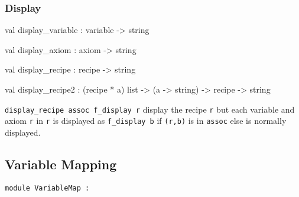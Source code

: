 \subsubsection{Display}




\label{val:Recipe.display-underscorevariable}\begin{ocamldoccode}
val display_variable : variable -> string
\end{ocamldoccode}




\label{val:Recipe.display-underscoreaxiom}\begin{ocamldoccode}
val display_axiom : axiom -> string
\end{ocamldoccode}




\label{val:Recipe.display-underscorerecipe}\begin{ocamldoccode}
val display_recipe : recipe -> string
\end{ocamldoccode}




\label{val:Recipe.display-underscorerecipe2}\begin{ocamldoccode}
val display_recipe2 :
  (recipe * {\textquotesingle}a) list -> ({\textquotesingle}a -> string) -> recipe -> string
\end{ocamldoccode}
\begin{ocamldocdescription}
{\tt{display\_recipe assoc f\_display r}} display the recipe {\tt{r}} but each variable
    and axiom {\tt{r{\textquotesingle}}} in {\tt{r}} is displayed as {\tt{f\_display b}} if {\tt{(r{\textquotesingle},b)}} is in {\tt{assoc}}
    else is normally displayed.


\end{ocamldocdescription}




\subsection{Variable Mapping}




\begin{ocamldoccode}
{\tt{module }}{\tt{VariableMap}}{\tt{ : }}\end{ocamldoccode}
\label{module:Recipe.VariableMap}

